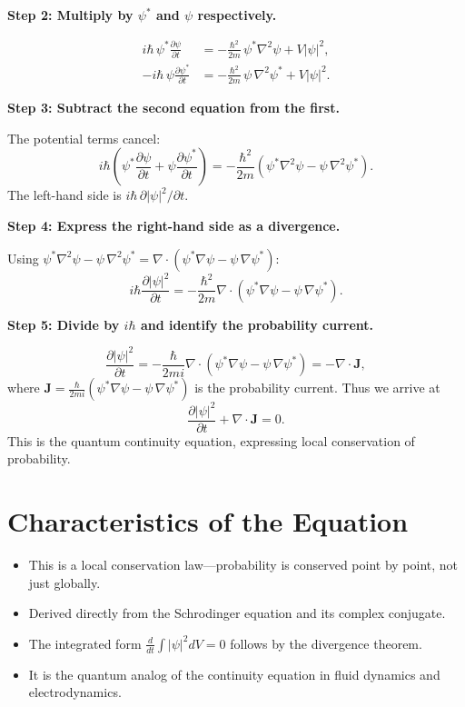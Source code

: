 \textbf{Step 2: Multiply by $\psi^*$ and $\psi$ respectively.}

\begin{align}
i\hbar\,\psi^*\frac{\partial\psi}{\partial t} &= -\frac{\hbar^2}{2m}\,\psi^*\nabla^2\psi + V|\psi|^2, \\
-i\hbar\,\psi\frac{\partial\psi^*}{\partial t} &= -\frac{\hbar^2}{2m}\,\psi\,\nabla^2\psi^* + V|\psi|^2.
\end{align}

\textbf{Step 3: Subtract the second equation from the first.}

The potential terms cancel:
\begin{equation}
i\hbar\left(\psi^*\frac{\partial\psi}{\partial t} + \psi\frac{\partial\psi^*}{\partial t}\right) = -\frac{\hbar^2}{2m}\left(\psi^*\nabla^2\psi - \psi\,\nabla^2\psi^*\right).
\end{equation}
The left-hand side is $i\hbar\,\partial|\psi|^2/\partial t$.

\textbf{Step 4: Express the right-hand side as a divergence.}

Using $\psi^*\nabla^2\psi - \psi\,\nabla^2\psi^* = \nabla\cdot(\psi^*\nabla\psi - \psi\,\nabla\psi^*)$:
\begin{equation}
i\hbar\frac{\partial|\psi|^2}{\partial t} = -\frac{\hbar^2}{2m}\nabla\cdot\left(\psi^*\nabla\psi - \psi\,\nabla\psi^*\right).
\end{equation}

\textbf{Step 5: Divide by $i\hbar$ and identify the probability current.}

\begin{equation}
\frac{\partial|\psi|^2}{\partial t} = -\frac{\hbar}{2mi}\nabla\cdot\left(\psi^*\nabla\psi - \psi\,\nabla\psi^*\right) = -\nabla\cdot\mathbf{J},
\end{equation}
where $\mathbf{J} = \frac{\hbar}{2mi}(\psi^*\nabla\psi - \psi\,\nabla\psi^*)$ is the probability current. Thus we arrive at
\begin{equation}
\boxed{\frac{\partial|\psi|^2}{\partial t} + \nabla\cdot\mathbf{J} = 0.}
\end{equation}
This is the quantum continuity equation, expressing local conservation of probability.

\section*{Characteristics of the Equation}

\begin{itemize}
    \item This is a local conservation law---probability is conserved point by point, not just globally.
    \item Derived directly from the Schrodinger equation and its complex conjugate.
    \item The integrated form $\frac{d}{dt}\int|\psi|^2 dV = 0$ follows by the divergence theorem.
    \item It is the quantum analog of the continuity equation in fluid dynamics and electrodynamics.
\end{itemize}
